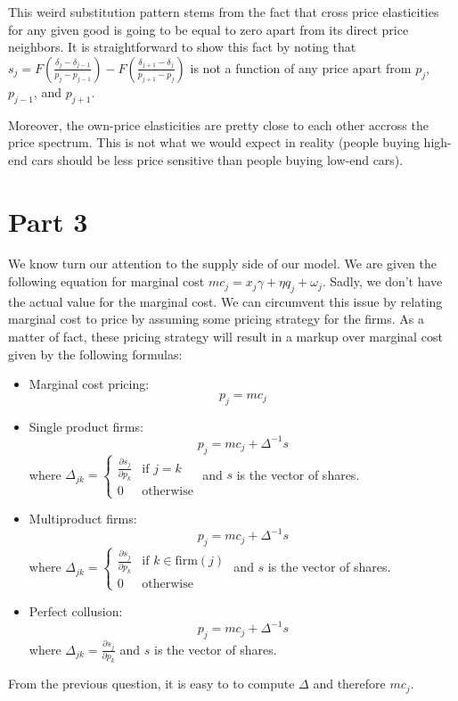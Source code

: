 \documentclass[12pt]{article}
\newcommand{\1}{{\bf 1}} %
\newcommand{\inv}{^{-1}}
\newcommand{\mat}[1]{\begin{matrix}#1\end{matrix}}
\begin{document}
This weird substitution pattern stems from the fact that cross price elasticities for any given good is going to be equal to zero apart from its direct price neighbors. It is straightforward to show this fact by noting that $s_j= F\left({\frac{\delta_j-\delta_{j-1}}{p_j-p_{j-1}}}\right) - F\left( {\frac{\delta_{j+1}-\delta_{j}}{p_{j+1}-p_{j}}}\right)$ is not a function of any price apart from $p_j$, $p_{j-1}$, and $p_{j+1}$.

Moreover, the own-price elasticities are pretty close to each other accross the price spectrum. This is not what we would expect in reality (people buying high-end cars should be less price sensitive than people buying low-end cars).

\section*{Part 3}

We know turn our attention to the supply side of our model. We are given the following equation for marginal cost $mc_j = x_j\gamma +\eta q_j +\omega_j$. Sadly, we don't have the actual value for the marginal cost. We can circumvent this issue by relating marginal cost to price by assuming some pricing strategy for the firms. As a matter of fact, these pricing strategy will result in a markup over marginal cost given by the following formulas:
\begin{itemize}
	\item Marginal cost pricing:
	\[
p_j = mc_j
	\]
	\item Single product firms:
	\[
p_j = mc_j +\Delta\inv s
	\]
	where $\Delta_{jk} = \left\{\mat{\frac{\partial s_j}{\partial p_k} & \text{if }j=k\\ 0 & \text{otherwise}}\right.$ and $s$ is the vector of shares.

	\item Multiproduct firms:
	\[
p_j = mc_j +\Delta\inv s
	\]
	where $\Delta_{jk} = \left\{\mat{\frac{\partial s_j}{\partial p_k} & \text{if }k\in \text{firm}(j)\\ 0 & \text{otherwise}}\right.$ and $s$ is the vector of shares.

	\item Perfect collusion:
	\[
p_j = mc_j +\Delta\inv s
	\]
	where $\Delta_{jk} = \frac{\partial s_j}{\partial p_k} $ and $s$ is the vector of shares.
\end{itemize}

From the previous question, it is easy to to compute $\Delta$ and therefore $mc_j$.
\end{document}
